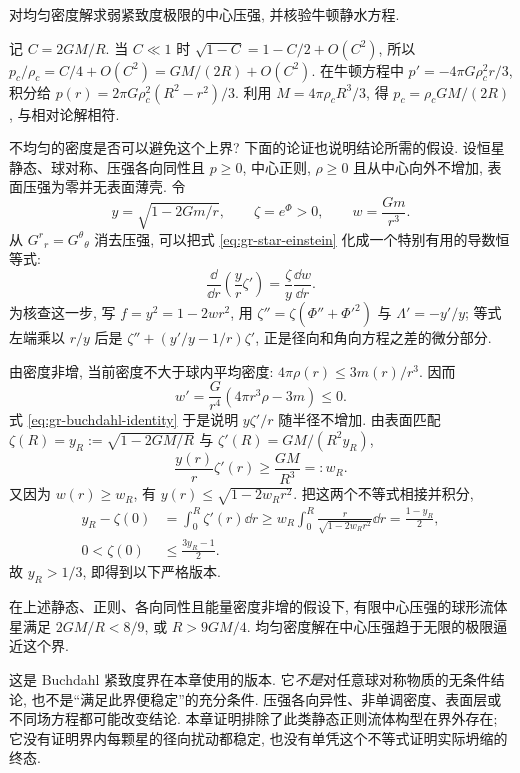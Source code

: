 \begin{example}
 对均匀密度解求弱紧致度极限的中心压强, 并核验牛顿静水方程.
\end{example}
\begin{solution}
 记 $C=2GM/R$. 当 $C\ll1$ 时 $\sqrt{1-C}=1-C/2+O(C^2)$, 所以 $p_c/\rho_c=C/4+O(C^2)=GM/(2R)+O(C^2)$. 在牛顿方程中 $p'=-4\pi G\rho_c^2r/3$, 积分给 $p(r)=2\pi G\rho_c^2(R^2-r^2)/3$. 利用 $M=4\pi\rho_c R^3/3$, 得 $p_c=\rho_c GM/(2R)$, 与相对论解相符.
\end{solution}

不均匀的密度是否可以避免这个上界? 下面的论证也说明结论所需的假设. 设恒星静态、球对称、压强各向同性且 $p\ge0$, 中心正则, $\rho\ge0$ 且从中心向外不增加, 表面压强为零并无表面薄壳. 令
\[
 y=\sqrt{1-2Gm/r},\qquad \zeta=e^\Phi>0,\qquad
 w=\frac{Gm}{r^3}.
\]
从 $G^r{}_r=G^\theta{}_\theta$ 消去压强, 可以把式 \eqref{eq:gr-star-einstein} 化成一个特别有用的导数恒等式:
\begin{equation}
 \frac{\dd}{\dd r}\left(\frac y r\zeta'\right)
      =\frac\zeta y\frac{\dd w}{\dd r}.
 \label{eq:gr-buchdahl-identity}
\end{equation}
为核查这一步, 写 $f=y^2=1-2wr^2$, 用 $\zeta''=\zeta(\Phi''+\Phi'^2)$ 与 $\Lambda'=-y'/y$; 等式左端乘以 $r/y$ 后是 $\zeta''+(y'/y-1/r)\zeta'$, 正是径向和角向方程之差的微分部分.

由密度非增, 当前密度不大于球内平均密度: $4\pi\rho(r)\le3m(r)/r^3$. 因而
\[
 w'=\frac G{r^4}(4\pi r^3\rho-3m)\le0.
\]
式 \eqref{eq:gr-buchdahl-identity} 于是说明 $y\zeta'/r$ 随半径不增加. 由表面匹配 $\zeta(R)=y_R:=\sqrt{1-2GM/R}$ 与 $\zeta'(R)=GM/(R^2y_R)$,
\[
 \frac{y(r)}r\zeta'(r)\ge\frac{GM}{R^3}=:w_R.
\]
又因为 $w(r)\ge w_R$, 有 $y(r)\le\sqrt{1-2w_Rr^2}$. 把这两个不等式相接并积分,
\begin{align*}
 y_R-\zeta(0)&=\int_0^R\zeta'(r)\dd r
 \ge w_R\int_0^R\frac r{\sqrt{1-2w_Rr^2}}\dd r
 =\frac{1-y_R}2,\\
 0<\zeta(0)&\le\frac{3y_R-1}2.
\end{align*}
故 $y_R>1/3$, 即得到以下严格版本.

\begin{theorem}
 在上述静态、正则、各向同性且能量密度非增的假设下, 有限中心压强的球形流体星满足 $2GM/R<8/9$, 或 $R>9GM/4$. 均匀密度解在中心压强趋于无限的极限逼近这个界.
\end{theorem}

这是 Buchdahl 紧致度界在本章使用的版本. 它\emph{不是}对任意球对称物质的无条件结论, 也不是“满足此界便稳定”的充分条件. 压强各向异性、非单调密度、表面层或不同场方程都可能改变结论. 本章证明排除了此类静态正则流体构型在界外存在; 它没有证明界内每颗星的径向扰动都稳定, 也没有单凭这个不等式证明实际坍缩的终态.

